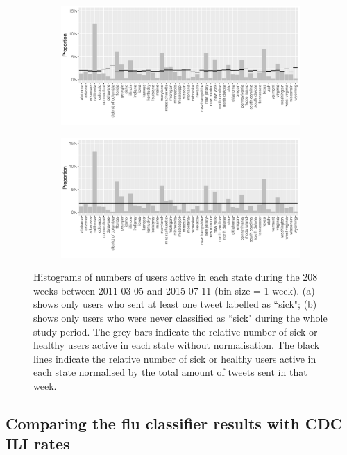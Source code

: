 \documentclass[11pt, a4paper,twoside]{report}\usepackage[]{graphicx}\usepackage[]{color}
\begin{document}
\begin{figure}[H]
\centering
  \begin{subfigure}[t]{1\textwidth}
  \includegraphics[width=1\linewidth]{22_activity_sick_user_statename_Twitter_full_aggregatedoverlay.pdf}
  \caption{}
  \end{subfigure}
\hfill
  \begin{subfigure}[t]{1\textwidth}
  \includegraphics[width=1\linewidth]{23_activity_healthy_user_statename_Twitter_full_aggregatedoverlay.pdf}
  \caption{}
  \end{subfigure}
  \caption{Histograms of numbers of users active in each state during the 208 weeks between 2011-03-05 and 2015-07-11 (bin size = 1 week). (a) shows only users who sent at least one tweet labelled as ``sick"; (b) shows only users who were never classified as ``sick" during the whole study period. The grey bars indicate the relative number of sick or healthy users active in each state without normalisation. The black lines indicate the relative number of sick or healthy users active in each state normalised by the total amount of tweets sent in that week.}
  \label{fig:tweets_state_healthy_sick_user}
\end{figure}

\subsection{Comparing the flu classifier results with CDC ILI rates}
\label{sec:comp_cdc}
\end{document}
